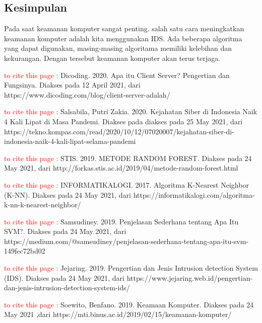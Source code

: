 \documentclass[conference]{IEEEtran}
\begin{document}
\subsection{Kesimpulan}
Pada saat keamanan komputer sangat penting. salah satu cara meningkatkan keamanan komputer adalah kita menggunakan IDS. Ada beberapa algoritma yang dapat digunakan, masing-masing algoritama memiliki kelebihan dan kekurangan.
Dengan tersebut keamanan komputer akan terus terjaga.




\vspace{12pt}
\textcolor{red}{to cite this page :} Dicoding. 2020. Apa itu Client Server? Pengertian dan Fungsinya. Diakses pada 12 April 2021, dari https://www.dicoding.com/blog/client-server-adalah/

\textcolor{red}{to cite this page :} Salsabila, Putri Zakia. 2020. Kejahatan Siber di Indonesia Naik 4 Kali Lipat di Masa Pandemi. Diakses pada diakses pada 25 May 2021, dari https://tekno.kompas.com/read/2020/10/12/07020007/kejahatan-siber-di-indonesia-naik-4-kali-lipat-selama-pandemi

\textcolor{red}{to cite this page :} STIS. 2019. METODE RANDOM FOREST. Diakses pada 24 May 2021, dari http://forkas.stis.ac.id/2019/04/metode-random-forest.html

\textcolor{red}{to cite this page :} INFORMATIKALOGI. 2017. Algoritma K-Nearest Neighbor (K-NN). Diakses pada 24 May 2021, dari https://informatikalogi.com/algoritma-k-nn-k-nearest-neighbor/

\textcolor{red}{to cite this page :} Samsudiney. 2019. Penjelasan Sederhana tentang Apa Itu SVM?. Diakses pada 24 May 2021, dari https://medium.com/@samsudiney/penjelasan-sederhana-tentang-apa-itu-svm-149fec72bd02

\textcolor{red}{to cite this page :} Jejaring. 2019. Pengertian dan Jenis Intrusion detection System (IDS). Diakses pada 24 May 2021, dari https://www.jejaring.web.id/pengertian-dan-jenis-intrusion-detection-system-ids/

\textcolor{red}{to cite this page :} Soewito, Benfano. 2019. Keamaan Komputer. Diakses pada 24 May 2021 ,dari https://mti.binus.ac.id/2019/02/15/keamanan-komputer/
\end{document}
